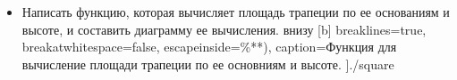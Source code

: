\begin{itemize}
	\item Написать функцию, которая вычисляет площадь трапеции по ее основаниям и высоте, и составить диаграмму ее вычисления.
		 внизу [b] 
		breaklines=true,           %
		breakatwhitespace=false, %
		escapeinside={\%*}{*)},  %
		caption=Функция для вычисление площади трапеции по ее основниям и высоте.
		]{./square}
\end{itemize}